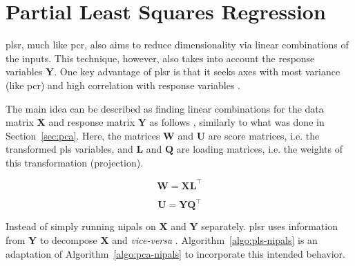 \section{Partial Least Squares Regression}
\label{sec:plsr}

\acrshort{plsr}, much like \acrshort{pcr}, also aims to reduce dimensionality via linear combinations of the inputs. This technique, however, also takes into account the response variables $\mathbf{Y}$. One key advantage of \acrshort{plsr} is that it seeks axes with most variance (like \acrshort{pcr}) and high correlation with response variables \parencite{friedman2001}.

The main idea can be described as  finding  linear combinations  for the data matrix $\mathbf{X}$ and response matrix $\mathbf{Y}$ as follows \parencite{ng2013}, similarly to what was done in Section~\ref{sec:pca}. Here, the matrices $\mathbf{W}$ and $\mathbf{U}$ are score matrices, i.e. the transformed \acrshort{pls} variables, and $\mathbf{L}$ and $\mathbf{Q}$ are loading matrices, i.e. the weights of this transformation (projection).

\begin{equation}
	\label{eqn:x-decomp}
	\mathbf{W=XL^\intercal}
\end{equation}

\begin{equation}
	\label{eqn:y-decomp}
	\mathbf{U = YQ^\intercal}
\end{equation}

Instead of simply running \acrshort{nipals} on $\mathbf{X}$ and $\mathbf{Y}$ separately. \acrshort{plsr} uses information from $\mathbf{Y}$ to decompose $\mathbf{X}$ and \textit{vice-versa} \parencite{ng2013}. Algorithm~\ref{algo:pls-nipals} is an adaptation of Algorithm~\ref{algo:pca-nipals} to incorporate this intended behavior.

